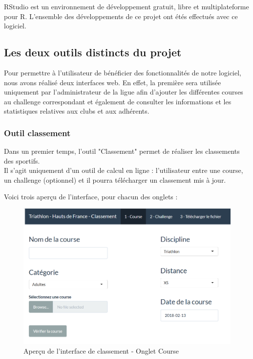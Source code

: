 RStudio est un environnement de développement gratuit, libre et multiplateforme pour R.
L'ensemble des développements de ce projet ont étés effectués avec ce logiciel.


\newpage
\subsection {Les deux outils distincts du projet}
Pour permettre à l’utilisateur de bénéficier des fonctionnalités de notre logiciel, nous avons réalisé deux interfaces web. En effet, la première sera utilisée uniquement par l’administrateur de la ligue afin d’ajouter les différentes courses au challenge correspondant et également de consulter les informations et les statistiques relatives aux clubs et aux adhérents.

\subsubsection{Outil classement}

Dans un premier temps, l'outil "Classement" permet de réaliser les classements des sportifs. \\
Il s'agit uniquement d'un outil de calcul en ligne : l'utilisateur entre une course, un challenge (optionnel) et il pourra télécharger un classement mis à jour.

Voici trois aperçu de l'interface, pour chacun des onglets :

\begin{figure}[!h]
	\center
	\includegraphics[scale=0.9]{img/admin_global.PNG}
	\caption {Aperçu de l'interface de classement - Onglet Course}
\end{figure}


